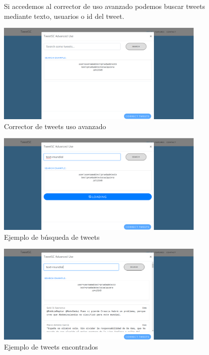 \documentclass[spanish,12pt, a4paper,twoside]{paper}
\begin{document}
\begin{figure}[h]
Si accedemos al corrector de uso avanzado podemos buscar tweets mediante texto, usuarios o id del tweet.
\begin{center}
 \includegraphics[width=0.9\textwidth]{recursos/WebUseIt_AdvancedUse.png}
\caption{Corrector de tweets uso avanzado}
\label{fig:webuseitadvanceduse}
\end{center}
\end{figure}

\begin{figure}[h]
\centering
 \includegraphics[width=0.9\textwidth]{recursos/WebUseIt_AdvancedUse_Loading.png}
\caption{Ejemplo de búsqueda de tweets}
\label{fig:webuseitadvanceduseloading}
\end{figure}

\begin{figure}[h]
\centering
 \includegraphics[width=0.9\textwidth]{recursos/WebUseIt_AdvancedUse_SearchResult.png}
\caption{Ejemplo de tweets encontrados}
\label{fig:webuseitadvancedusesearchresult}
\end{figure}
\end{document}
